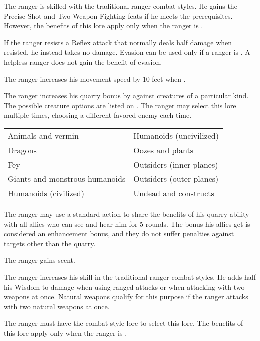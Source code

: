  The ranger is skilled with the traditional ranger combat styles. He gains the Precise Shot and Two-Weapon Fighting feats if he meets the prerequisites. However, the benefits of this lore apply only when the ranger is \unencumbered.

 If the ranger resists a Reflex attack that normally deals half damage when resisted, he instead takes no damage. Evasion can be used only if a ranger is \unencumbered. A helpless ranger does not gain the benefit of evasion.

 The ranger increases his movement speed by 10 feet when \unencumbered.

 The ranger increases his quarry bonus by  against creatures of a particular kind. The possible creature options are listed on . The ranger may select this lore multiple times, choosing a different favored enemy each time.

\begin{dtable}
\begin{tabularx}{\columnwidth}{X X}
Animals and vermin & Humanoids (uncivilized) \\
Dragons & Oozes and plants \\
Fey & Outsiders (inner planes) \\
Giants and monstrous humanoids & Outsiders (outer planes) \\
Humanoids (civilized)  & Undead and constructs \\
\end{tabularx}
\end{dtable}

 The ranger may use a standard action to share the benefits of his quarry ability with all allies who can see and hear him for 5 rounds. The bonus his allies get is considered an enhancement bonus, and they do not suffer penalties against targets other than the quarry.

 The ranger gains scent. 

 The ranger increases his skill in the traditional ranger combat styles. He adds half his Wisdom to damage when using ranged attacks or when attacking with two weapons at once. Natural weapons qualify for this purpose if the ranger attacks with two natural weapons at once.

The ranger must have the combat style lore to select this lore. The benefits of this lore apply only when the ranger is \unencumbered.

